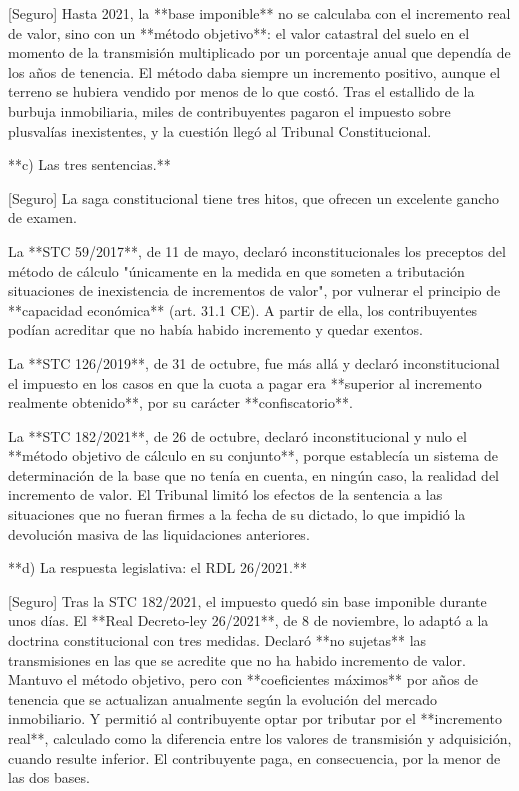\documentclass[10pt,a4paper]{article}
\begin{document}
[Seguro] Hasta 2021, la **base imponible** no se calculaba con el incremento real de valor, sino con un **método objetivo**: el valor catastral del suelo en el momento de la transmisión multiplicado por un porcentaje anual que dependía de los años de tenencia. El método daba siempre un incremento positivo, aunque el terreno se hubiera vendido por menos de lo que costó. Tras el estallido de la burbuja inmobiliaria, miles de contribuyentes pagaron el impuesto sobre plusvalías inexistentes, y la cuestión llegó al Tribunal Constitucional.

**c) Las tres sentencias.**

[Seguro] La saga constitucional tiene tres hitos, que ofrecen un excelente gancho de examen.

La **STC 59/2017**, de 11 de mayo, declaró inconstitucionales los preceptos del método de cálculo "únicamente en la medida en que someten a tributación situaciones de inexistencia de incrementos de valor", por vulnerar el principio de **capacidad económica** (art. 31.1 CE). A partir de ella, los contribuyentes podían acreditar que no había habido incremento y quedar exentos.

La **STC 126/2019**, de 31 de octubre, fue más allá y declaró inconstitucional el impuesto en los casos en que la cuota a pagar era **superior al incremento realmente obtenido**, por su carácter **confiscatorio**.

La **STC 182/2021**, de 26 de octubre, declaró inconstitucional y nulo el **método objetivo de cálculo en su conjunto**, porque establecía un sistema de determinación de la base que no tenía en cuenta, en ningún caso, la realidad del incremento de valor. El Tribunal limitó los efectos de la sentencia a las situaciones que no fueran firmes a la fecha de su dictado, lo que impidió la devolución masiva de las liquidaciones anteriores.

**d) La respuesta legislativa: el RDL 26/2021.**

[Seguro] Tras la STC 182/2021, el impuesto quedó sin base imponible durante unos días. El **Real Decreto-ley 26/2021**, de 8 de noviembre, lo adaptó a la doctrina constitucional con tres medidas. Declaró **no sujetas** las transmisiones en las que se acredite que no ha habido incremento de valor. Mantuvo el método objetivo, pero con **coeficientes máximos** por años de tenencia que se actualizan anualmente según la evolución del mercado inmobiliario. Y permitió al contribuyente optar por tributar por el **incremento real**, calculado como la diferencia entre los valores de transmisión y adquisición, cuando resulte inferior. El contribuyente paga, en consecuencia, por la menor de las dos bases.
\end{document}
